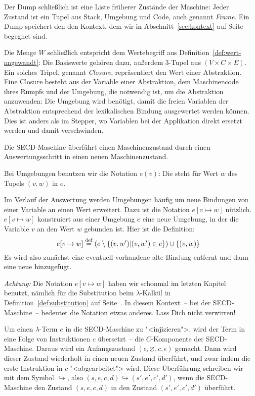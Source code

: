 Der Dump schließlich ist eine Liste früherer Zustände der Maschine:
Jeder Zustand ist ein Tupel aus Stack, Umgebung und Code, auch genannt
\textit{Frame}. Ein Dump speichert den den
Kontext, dem wir in Abschnitt~\ref{sec:kontext} auf
Seite~\pageref{sec:kontext} begegnet sind.

Die Menge $W$ schließlich entspricht dem Wertebegriff aus
Definition~\ref{def:wert-angewandt}: Die Basiswerte gehören dazu,
außerdem 3-Tupel aus $(V\times C\times E)$.  Ein solches Tripel,
genannt \textit{Closure}, repräsentiert den Wert
einer Abstraktion.  Eine Closure besteht aus der Variable einer Abstraktion,
dem Maschinencode ihres Rumpfs und der Umgebung, die notwendig ist, um
die Abstraktion anzuwenden: Die Umgebung wird benötigt, damit die
freien Variablen der Abstraktion entsprechend der lexikalischen
Bindung ausgewertet werden können.  Dies
ist anders als im Stepper, wo Variablen bei der
Applikation direkt ersetzt werden und damit verschwinden.

Die SECD-Maschine überführt einen Maschinenzustand durch einen
Auswertungsschritt in einen neuen Maschinenzustand.

Bei Umgebungen benutzen wir die Notation $e(v)$: Die steht für Wert
$w$ des Tupels $(v, w)$ in $e$.

Im Verlauf der Auswertung werden Umgebungen häufig um neue Bindungen
von einer Variable an einen Wert erweitert.  Dazu ist die Notation
$e[v\mapsto w]$ nützlich.  $e[v\mapsto w]$ konstruiert aus einer
Umgebung $e$ eine neue Umgebung, in der die Variable $v$ an den Wert
$w$ gebunden ist.  Hier ist die Definition:
%
\begin{displaymath}
  e[v\mapsto w] \stackrel{\rm def}{=} (e \setminus \{ (v, w') | (v, w') \in e \}) \cup \{
    (v, w) \}
\end{displaymath}
%
Es wird also zunächst eine eventuell vorhandene alte Bindung entfernt
und dann eine neue hinzugefügt.

\emph{Achtung:} Die Notation $e[v\mapsto w]$ haben wir schonmal im
letzten Kapitel benutzt, nämlich für die Substitution beim
$\lambda$-Kalkül in Definition~\ref{def:substitution} auf
Seite~\pageref{def:substitution}.  In diesem Kontext~-- bei der
SECD-Maschine~-- bedeutet die Notation etwas anderes.  Lass Dich nicht
verwirren!

Um einen $\lambda$-Term $e$ in die SECD-Maschine zu "<injizieren">,
wird der Term in eine Folge von Instruktionen $c$ übersetzt~-- die
$C$-Komponente der SECD-Maschine.  Daraus wird ein Anfangszustand
$(\epsilon, \varnothing, c, \epsilon)$ gemacht.  Dann wird dieser
Zustand wiederholt in einen neuen Zustand überführt, und zwar indem
die erste Instruktion in $c$ "<abgearbeitet"> wird.  Diese Überführung
schreiben wir mit dem Symbol $\hookrightarrow$, also $(s, e, c, d)
\hookrightarrow (s', e', c', d')$, wenn die SECD-Maschine den Zustand
$(s, e, c, d)$ in den Zustand $(s', e', c', d')$ überführt.


